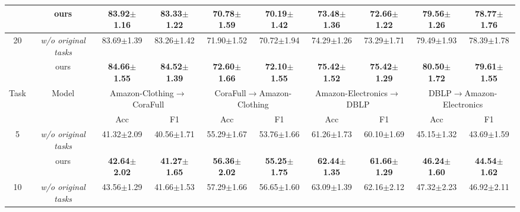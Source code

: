 \begin{table*}[ht]
{\begin{tabular}{@{}c|c|cccccccc@{}}
                      & ours                   & \textbf{83.92$\pm$1.16}          & \textbf{83.33$\pm$1.22}         & \textbf{70.78$\pm$1.59}          & \textbf{70.19$\pm$1.42}         & \textbf{73.48$\pm$1.36}         & \textbf{72.66$\pm$1.22}         & \textbf{79.56$\pm$1.26}         & \textbf{78.77$\pm$1.76}         \\ \midrule
\multirow{2}{*}{20}   & \textit{w/o original tasks}                 & 83.69$\pm$1.39                   & 83.26$\pm$1.42                  & 71.90$\pm$1.52                   & 70.72$\pm$1.94                  & 74.29$\pm$1.26                  & 73.29$\pm$1.71                  & 79.49$\pm$1.93                  & 78.39$\pm$1.78                  \\
                      & ours                   & \textbf{84.66$\pm$1.55}          & \textbf{84.52$\pm$1.39}         & \textbf{72.60$\pm$1.66}          & \textbf{72.10$\pm$1.55}         & \textbf{75.42$\pm$1.52}         & \textbf{75.42$\pm$1.29}         & \textbf{80.50$\pm$1.72}         & \textbf{79.61$\pm$1.55}         \\ \midrule
\multirow{2}{*}{Task} & \multirow{2}{*}{Model} & \multicolumn{2}{c}{Amazon-Clothing$\rightarrow$CoraFull} & \multicolumn{2}{c}{CoraFull$\rightarrow$Amazon-Clothing} & \multicolumn{2}{c}{Amazon-Electronics$\rightarrow$DBLP} & \multicolumn{2}{c}{DBLP$\rightarrow$Amazon-Electronics} \\ \cmidrule(l){3-10} 
                      &                        & Acc                          & F1                          & Acc                          & F1                          & Acc                         & F1                          & Acc                         & F1                          \\ \midrule
\multirow{2}{*}{5}    & \textit{w/o original tasks}                 & 41.32$\pm$2.09                   & 40.56$\pm$1.71                  & 55.29$\pm$1.67                   & 53.76$\pm$1.66                  & 61.26$\pm$1.73                  & 60.10$\pm$1.69                  & 45.15$\pm$1.32                  & 43.69$\pm$1.59                  \\
                      & ours                   & \textbf{42.64$\pm$2.02}          & \textbf{41.27$\pm$1.65}         & \textbf{56.36$\pm$2.02}          & \textbf{55.25$\pm$1.75}         & \textbf{62.44$\pm$1.35}         & \textbf{61.66$\pm$1.29}         & \textbf{46.24$\pm$1.60}         & \textbf{44.54$\pm$1.62}         \\ \midrule
\multirow{2}{*}{10}   & \textit{w/o original tasks}                 & 43.56$\pm$1.29                   & 41.66$\pm$1.53                  & 57.29$\pm$1.66                   & 56.65$\pm$1.60                  & 63.09$\pm$1.39                  & 62.16$\pm$2.12                  & 47.32$\pm$2.23                  & 46.92$\pm$2.11                  \\

\end{tabular}}
\end{table*}
